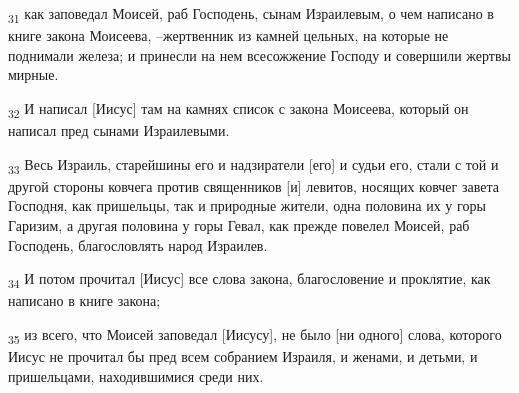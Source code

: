 \begin{tcolorbox}
\textsubscript{31} как заповедал Моисей, раб Господень, сынам Израилевым, о чем написано в книге закона Моисеева, --жертвенник из камней цельных, на которые не поднимали железа; и принесли на нем всесожжение Господу и совершили жертвы мирные.
\end{tcolorbox}
\begin{tcolorbox}
\textsubscript{32} И написал [Иисус] там на камнях список с закона Моисеева, который он написал пред сынами Израилевыми.
\end{tcolorbox}
\begin{tcolorbox}
\textsubscript{33} Весь Израиль, старейшины его и надзиратели [его] и судьи его, стали с той и другой стороны ковчега против священников [и] левитов, носящих ковчег завета Господня, как пришельцы, так и природные жители, одна половина их у горы Гаризим, а другая половина у горы Гевал, как прежде повелел Моисей, раб Господень, благословлять народ Израилев.
\end{tcolorbox}
\begin{tcolorbox}
\textsubscript{34} И потом прочитал [Иисус] все слова закона, благословение и проклятие, как написано в книге закона;
\end{tcolorbox}
\begin{tcolorbox}
\textsubscript{35} из всего, что Моисей заповедал [Иисусу], не было [ни одного] слова, которого Иисус не прочитал бы пред всем собранием Израиля, и женами, и детьми, и пришельцами, находившимися среди них.
\end{tcolorbox}
